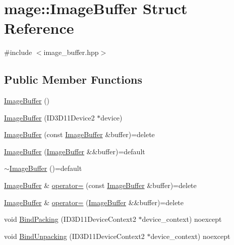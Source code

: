 \hypertarget{structmage_1_1_image_buffer}{}\section{mage\+:\+:Image\+Buffer Struct Reference}
\label{structmage_1_1_image_buffer}


{\ttfamily \#include $<$image\+\_\+buffer.\+hpp$>$}

\subsection*{Public Member Functions}
\begin{DoxyCompactItemize}
\item 
\hyperlink{structmage_1_1_image_buffer_a56adf7564a85ec33716e40fbd0d1956c}{Image\+Buffer} ()
\item 
\hyperlink{structmage_1_1_image_buffer_aaa39b98fe308c01bcb4b9aa719c79149}{Image\+Buffer} (I\+D3\+D11\+Device2 $\ast$device)
\item 
\hyperlink{structmage_1_1_image_buffer_a2614d34f1f48db316a6a184706dc66fc}{Image\+Buffer} (const \hyperlink{structmage_1_1_image_buffer}{Image\+Buffer} \&buffer)=delete
\item 
\hyperlink{structmage_1_1_image_buffer_a9e6a44d108113632cd333c7b76cdcefb}{Image\+Buffer} (\hyperlink{structmage_1_1_image_buffer}{Image\+Buffer} \&\&buffer)=default
\item 
\hyperlink{structmage_1_1_image_buffer_aa00e7ff960642ddb98f19502460a24a8}{$\sim$\+Image\+Buffer} ()=default
\item 
\hyperlink{structmage_1_1_image_buffer}{Image\+Buffer} \& \hyperlink{structmage_1_1_image_buffer_a4d89827bca3d3f2e748536b6b6a40470}{operator=} (const \hyperlink{structmage_1_1_image_buffer}{Image\+Buffer} \&buffer)=delete
\item 
\hyperlink{structmage_1_1_image_buffer}{Image\+Buffer} \& \hyperlink{structmage_1_1_image_buffer_aa82afa518fa42edea4ada42b9adb92df}{operator=} (\hyperlink{structmage_1_1_image_buffer}{Image\+Buffer} \&\&buffer)=delete
\item 
void \hyperlink{structmage_1_1_image_buffer_a23a4777a9a3a5d8bc4c13def5aa5cd41}{Bind\+Packing} (I\+D3\+D11\+Device\+Context2 $\ast$device\+\_\+context) noexcept
\item 
void \hyperlink{structmage_1_1_image_buffer_a868356b0b6cbaad167bb63e8188e89d4}{Bind\+Unpacking} (I\+D3\+D11\+Device\+Context2 $\ast$device\+\_\+context) noexcept
\end{DoxyCompactItemize}
